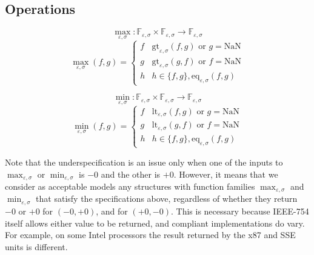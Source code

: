 \subsection{Operations}


\[
\max_{\varepsilon,\sigma} : \mathbb{F}_{\varepsilon,\sigma} \times \mathbb{F}_{\varepsilon,\sigma} \to \mathbb{F}_{\varepsilon,\sigma}
\]
\[
\max_{\varepsilon,\sigma}(f,g) = \begin{cases}
f & \text{gt}_{\varepsilon,\sigma}(f,g) \text{ or } g = \text{NaN} \\
g & \text{gt}_{\varepsilon,\sigma}(g,f) \text{ or } f = \text{NaN} \\
h & h \in \{f,g\}, \text{eq}_{\varepsilon,\sigma}(f,g)
\end{cases}
\]

\[
\min_{\varepsilon,\sigma} : \mathbb{F}_{\varepsilon,\sigma} \times \mathbb{F}_{\varepsilon,\sigma} \to \mathbb{F}_{\varepsilon,\sigma}
\]
\[
\min_{\varepsilon,\sigma}(f,g) = \begin{cases}
f & \text{lt}_{\varepsilon,\sigma}(f,g) \text{ or } g = \text{NaN} \\
g & \text{lt}_{\varepsilon,\sigma}(g,f) \text{ or } f = \text{NaN} \\
h & h \in \{f,g\}, \text{eq}_{\varepsilon,\sigma}(f,g)
\end{cases}
\]



Note that the underspecification is an issue only when one of the inputs to $\max_{\varepsilon,\sigma}$ or $\min_{\varepsilon,\sigma}$ is $-0$ and the other is $+0$. However, it means that we consider as acceptable models any structures with function families $\max_{\varepsilon,\sigma}$ and $\min_{\varepsilon,\sigma}$ that satisfy the specifications above, regardless of whether they return $-0$ or $+0$ for $(-0, +0)$, and for $(+0, -0)$. This is necessary because IEEE-754 itself allows either value to be returned, and compliant implementations do vary. For example, on some Intel processors the result returned by the x87 and SSE units is different.


